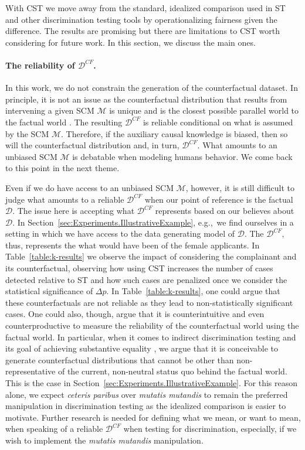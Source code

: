 % 
With CST we move away from the standard, idealized comparison used in ST and other discrimination testing tools by operationalizing fairness given the difference. 
The results are promising but there are limitations to CST worth considering for future work.
In this section, we discuss the main ones.

\paragraph{The reliability of $\mathcal{D}^{CF}$.}
In this work, we do not constrain the generation of the counterfactual dataset. 
In principle, it is not an issue as the counterfactual distribution that results from intervening a given SCM $\mathcal{M}$ is unique and is the closest possible parallel world to the factual world \parencite{KarimiKSV2020_AlgoRecourseImperfectInfo, Woodward2005MakingThigsHappen}.
The resulting $\mathcal{D}^{CF}$ is reliable conditional on what is assumed by the SCM $\mathcal{M}$. 
Therefore, if the auxiliary causal knowledge is biased, then so will the counterfactual distribution and, in turn, $\mathcal{D}^{CF}$. 
What amounts to an unbiased SCM $\mathcal{M}$ is debatable when modeling humans behavior.
We come back to this point in the next theme.

Even if we do have access to an unbiased SCM $\mathcal{M}$, however, it is still difficult to judge what amounts to a reliable $\mathcal{D}^{CF}$ when our point of reference is the factual $\mathcal{D}$.
The issue here is accepting what $\mathcal{D}^{CF}$ represents based on our believes about $\mathcal{D}$. 
In Section~\ref{sec:Experiments.IllustrativeExample}, e.g.,~we find ourselves in a setting in which we have access to the data generating model of $\mathcal{D}$. 
The $\mathcal{D}^{CF}$, thus, represents the what would have been of the female applicants.
In Table~\ref{table:k-results} we observe the impact of considering the complainant and its counterfactual, observing how using CST increases the number of cases detected relative to ST and how such cases are penalized once we consider the statistical significance of $\Delta p$.
In Table~\ref{table:k-results}, one could argue that these counterfactuals are not reliable as they lead to non-statistically significant cases. 
One could also, though, argue that it is counterintuitive and even counterproductive to measure the reliability of the counterfactual world using the factual world.
%
In particular,
when it comes to indirect discrimination testing and its goal of achieving substantive equality \parencite{Wachter2020BiasPreserving}, 
we argue that it is conceivable to generate counterfactual distributions that cannot be other than non-representative of the current, non-neutral status quo behind the factual world. 
This is the case in Section~\ref{sec:Experiments.IllustrativeExample}.
For this reason alone, we expect \textit{ceteris paribus} over \textit{mutatis mutandis} to remain the preferred manipulation in discrimination testing as the idealized comparison is easier to motivate.
Further research is needed for defining what we mean, or want to mean, when speaking of a reliable $\mathcal{D}^{CF}$ when testing for discrimination, especially, if we wish to implement the \textit{mutatis mutandis} manipulation.

